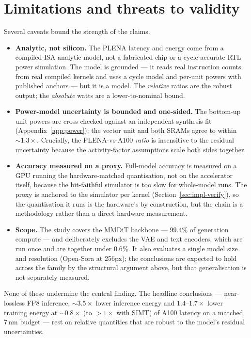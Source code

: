 \documentclass[11pt]{report}
\begin{document}
\section{Limitations and threats to validity}
\label{sec:eval-threats}

Several caveats bound the strength of the claims.

\begin{itemize}
\item \textbf{Analytic, not silicon.} The PLENA latency and energy come from
a compiled-ISA analytic model, not a fabricated chip or a cycle-accurate RTL
power simulation. The model is grounded --- it reads real instruction counts
from real compiled kernels and uses a cycle model and per-unit powers with
published anchors --- but it is a model. The \emph{relative} ratios are the
robust output; the \emph{absolute} watts are a lower-to-nominal bound.
\item \textbf{Power-model uncertainty is bounded and one-sided.} The
bottom-up unit powers are cross-checked against an independent synthesis fit
(Appendix~\ref{app:power}): the vector unit and both SRAMs agree to within
${\sim}1.3\times$. Crucially, the PLENA-vs-A100 \emph{ratio} is insensitive to
the residual uncertainty because the activity-factor assumptions scale both
sides together.
\item \textbf{Accuracy measured on a proxy.} Full-model accuracy is measured
on a GPU running the hardware-matched quantisation, not on the accelerator
itself, because the bit-faithful simulator is too slow for whole-model runs.
The proxy is anchored to the simulator per kernel
(Section~\ref{sec:impl-verify}), so the quantisation it runs is the hardware's
by construction, but the chain is a methodology rather than a direct
hardware measurement.
\item \textbf{Scope.} The study covers the MMDiT backbone --- $99.4\%$ of
generation compute --- and deliberately excludes the VAE and text encoders,
which are run once and are together under $0.6\%$. It also evaluates a single
model size and resolution (Open-Sora at 256px); the conclusions are expected
to hold across the family by the structural argument above, but that
generalisation is not separately measured.
\end{itemize}

None of these undermine the central finding. The headline conclusions ---
near-lossless FP8 inference, ${\sim}3.5\times$ lower inference energy and
$1.4$--$1.7\times$ lower training energy at ${\sim}0.8\times$ (to $>$$1\times$
with SIMT) of A100 latency on a matched 7\,nm budget --- rest on relative
quantities that are robust to the model's residual uncertainties.
\end{document}

